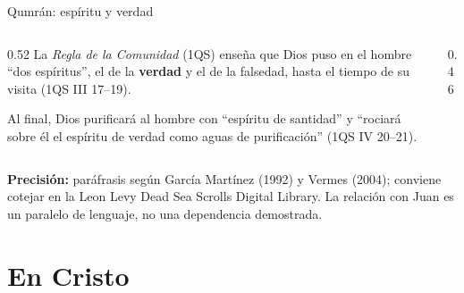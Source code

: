 \documentclass[hyperref={bookmarks=false},aspectratio=169]{beamer}
\newcommand{\destacar}[1]{\textbf{\textcolor{azul}{#1}}}
\newcommand{\precision}[1]{{\footnotesize\color{gris}\textbf{Precisión:} #1}}
\begin{document}
\begin{frame}{Qumrán: espíritu y verdad}
\begin{columns}[t,onlytextwidth]
\begin{column}{0.52\textwidth}\small
La \emph{Regla de la Comunidad} (1QS) enseña que Dios puso en el hombre ``dos espíritus'', el de la \destacar{verdad} y el de la falsedad, hasta el tiempo de su visita (1QS III 17--19).\par\smallskip
Al final, Dios purificará al hombre con ``espíritu de santidad'' y ``rociará sobre él el espíritu de verdad como aguas de purificación'' (1QS IV 20--21).
\end{column}
\begin{column}{0.46\textwidth}
\centering
{}
\end{column}
\end{columns}\par\smallskip
\precision{paráfrasis según García Martínez (1992) y Vermes (2004); conviene cotejar en la Leon Levy Dead Sea Scrolls Digital Library. La relación con Juan es un paralelo de lenguaje, no una dependencia demostrada.}
\end{frame}

\section{En Cristo}
\end{document}
